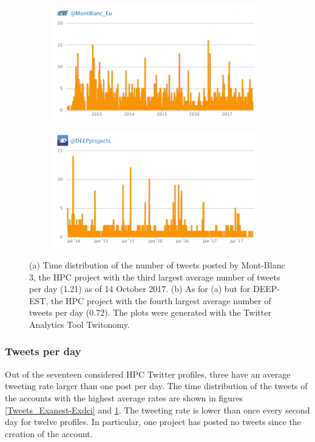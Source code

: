 \begin{figure}
 \centering
 \begin{subfigure}[t]{0.95\textwidth}
   \includegraphics[width=1\linewidth]{Images/Tweets_Montblanc.png}
   \caption{} 
 \end{subfigure}

 \begin{subfigure}[t]{0.95\textwidth}
   \includegraphics[width=1\linewidth]{Images/Tweets_Deepest.png}
   \caption{}
 \end{subfigure}
 \caption{(a) Time distribution of the number of tweets posted by Mont-Blanc 3, the HPC project with the third largest average number of tweets per day (1.21) as of 14 October 2017. (b) As for (a) but for DEEP-EST, the HPC project with the fourth largest average number of tweets per day (0.72). The plots were generated with the Twitter Analytics Tool Twitonomy.} 
 \label{Tweets_Montblanc-Deepest}
\end{figure}

\subsubsection{Tweets per day}
Out of the seventeen considered HPC Twitter profiles, three have an average tweeting rate larger than one post per day. The time distribution of the tweets of the accounts with the highest average rates are shown in figures \ref{Tweets_Exanest-Exdci} and \ref{Tweets_Montblanc-Deepest}. The tweeting rate is lower than once every second day for twelve profiles. In particular, one project has posted no tweets since the creation of the account. 

